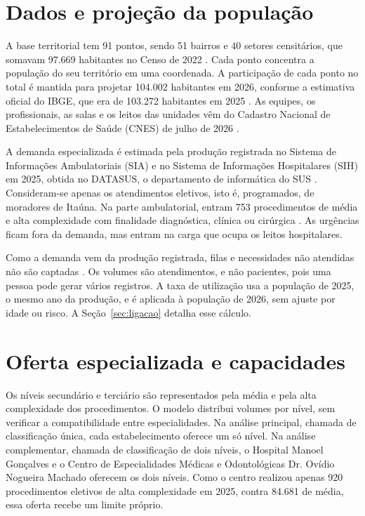 \documentclass[12pt,a4paper,oneside]{report}
\begin{document}
\section{Dados e projeção da população}
A base territorial tem 91 pontos, sendo 51 bairros e 40 setores censitários, que somavam 97.669
habitantes no Censo de 2022 \citep{ibge2022}. Cada ponto concentra a população do seu território em uma
coordenada. A participação de cada ponto no total é mantida para projetar 104.002 habitantes em 2026,
conforme a estimativa oficial do IBGE, que era de 103.272 habitantes em 2025 \citep{ibge2025est,ibge2026est}.
As equipes, os profissionais, as salas e os leitos das unidades vêm do Cadastro Nacional de
Estabelecimentos de Saúde (CNES) de julho de 2026 \citep{cnes2026}.

A demanda especializada é estimada pela produção registrada no Sistema de Informações Ambulatoriais (SIA)
e no Sistema de Informações Hospitalares (SIH) em 2025, obtida no DATASUS, o departamento de informática
do SUS \citep{datasus2026,tabnet}. Consideram-se apenas os atendimentos eletivos, isto é, programados, de
moradores de Itaúna. Na parte ambulatorial, entram 753 procedimentos de média e alta complexidade com
finalidade diagnóstica, clínica ou cirúrgica \citep{sigtap}. As urgências ficam fora da demanda, mas
entram na carga que ocupa os leitos hospitalares.

Como a demanda vem da produção registrada, filas e necessidades não atendidas não são captadas
\citep{santana2023}. Os volumes são atendimentos, e não pacientes, pois uma pessoa pode gerar vários
registros. A taxa de utilização usa a população de 2025, o mesmo ano da produção, e é aplicada à
população de 2026, sem ajuste por idade ou risco. A Seção~\ref{sec:ligacao} detalha esse cálculo.

\section{Oferta especializada e capacidades}
Os níveis secundário e terciário são representados pela média e pela alta complexidade dos
procedimentos. O modelo distribui volumes por nível, sem verificar a compatibilidade entre
especialidades. Na análise principal, chamada de classificação única, cada estabelecimento oferece um só
nível. Na análise complementar, chamada de classificação de dois níveis, o Hospital Manoel Gonçalves e o
Centro de Especialidades Médicas e Odontológicas Dr. Ovídio Nogueira Machado oferecem os dois níveis.
Como o centro realizou apenas 920 procedimentos eletivos de alta complexidade em 2025, contra 84.681 de
média, essa oferta recebe um limite próprio.
\end{document}

